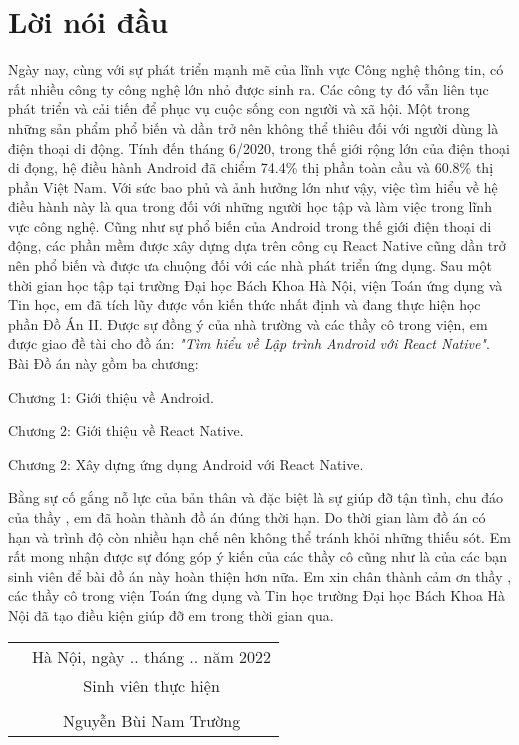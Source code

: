 \newpage
\section*{\centering Lời nói đầu}
Ngày nay, cùng với sự phát triển mạnh mẽ của lĩnh vực Công nghệ thông tin, có rất nhiều công ty công nghệ lớn nhỏ được sinh ra. Các công ty đó vẫn liên tục phát triển và cải tiến để phục vụ cuộc sống con người và xã hội. Một trong những sản phẩm phổ biến và dần trở nên không thể thiêu đối với người dùng là điện thoại di động. Tính đến tháng 6/2020, trong thế giới rộng lớn của điện thoại di đọng, hệ điều hành Android đã chiểm 74.4\% thị phần toàn cầu và 60.8\% thị phần Việt Nam. Với sức bao phủ và ảnh hưởng lớn như vậy, việc tìm hiểu về hệ điều hành này là qua trong đối với những người học tập và làm việc trong lĩnh vực công nghệ.
Cũng như sự phổ biến của Android trong thế giới điện thoại di động, các phần mềm được xây dựng dựa trên công cụ React Native cũng dần trở nên phổ biến và được ưa chuộng đối với các nhà phát triển ứng dụng.
Sau một thời gian học tập tại trường Đại học Bách Khoa Hà Nội, viện Toán ứng dụng và Tin học, em đã tích lũy được vốn kiến thức nhất định và đang thực hiện học phần Đồ Án II. Được sự đồng ý của nhà trường và các thầy cô trong viện, em được giao đề tài cho đồ án: \textit{"Tìm hiểu về Lập trình Android với React Native"}.
Bài Đồ án này gồm ba chương:

Chương 1: Giới thiệu về Android.

Chương 2: Giới thiệu về React Native.

Chương 2: Xây dựng ứng dụng Android với React Native.

Bằng sự cố gắng nỗ lực của bản thân và đặc biệt là sự giúp đỡ tận tình, chu đáo của thầy \instructor, em đã hoàn thành đồ án đúng thời hạn. Do thời gian làm đồ án có hạn và trình độ còn nhiều hạn chế nên không thể tránh khỏi những thiếu sót. Em rất mong nhận được sự đóng góp ý kiến của các thầy cô cũng như là của các bạn sinh viên để bài đồ án này hoàn thiện hơn nữa. Em xin chân thành cảm ơn thầy \instructor, các thầy cô trong viện Toán ứng dụng và Tin học trường Đại học Bách Khoa Hà Nội đã tạo điều kiện giúp đỡ em trong thời gian qua.

\begin{flushright}
	\begin{tabular}{rc}
		& Hà Nội, ngày .. tháng .. năm 2022 \\
		& Sinh viên thực hiện \\	
		\\
		& Nguyễn Bùi Nam Trường \\
	\end{tabular}
\end{flushright}
\newpage